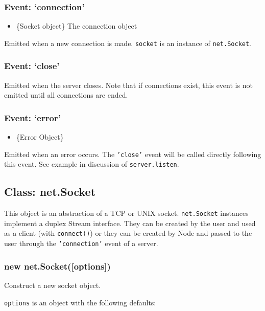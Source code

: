 \subsubsection{Event: `connection'}

\begin{itemize}
\item
  \{Socket object\} The connection object
\end{itemize}

Emitted when a new connection is made. \texttt{socket} is an instance of
\texttt{net.Socket}.

\subsubsection{Event: `close'}

Emitted when the server closes. Note that if connections exist, this
event is not emitted until all connections are ended.

\subsubsection{Event: `error'}

\begin{itemize}
\item
  \{Error Object\}
\end{itemize}

Emitted when an error occurs. The \texttt{'close'} event will be called
directly following this event. See example in discussion of
\texttt{server.listen}.

\subsection{Class: net.Socket}

This object is an abstraction of a TCP or UNIX socket.
\texttt{net.Socket} instances implement a duplex Stream interface. They
can be created by the user and used as a client (with
\texttt{connect()}) or they can be created by Node and passed to the
user through the \texttt{'connection'} event of a server.

\subsubsection{new net.Socket({[}options{]})}

Construct a new socket object.

\texttt{options} is an object with the following defaults:

